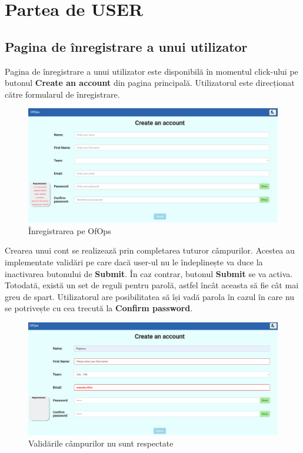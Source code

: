 \section{Partea de USER}

\subsection{Pagina de înregistrare a unui utilizator}

Pagina de înregistrare a unui utilizator este disponibilă în momentul click-ului pe butonul \textbf{Create an account} din pagina principală. Utilizatorul este direcționat către formularul de înregistrare.  

\newpage

\begin{figure}[!htb]
    \centering
    \includegraphics[width=0.9\linewidth]{images/inregistrare.png}
    \caption{Înregistrarea pe OfOps}
    \label{fig:inregistrare}
\end{figure}

Crearea unui cont se realizează prin completarea tuturor câmpurilor. Acestea au implementate validări pe care dacă user-ul nu le îndeplinește va duce la inactivarea butonului de \textbf{Submit}. În caz contrar, butonul \textbf{Submit} se va activa. Totodată, există un set de reguli pentru parolă, astfel încât aceasta să fie cât mai greu de spart. Utilizatorul are posibilitatea să își vadă parola în cazul în care nu se potrivește cu cea trecută la \textbf{Confirm password}.

\begin{figure}[!htb]
    \centering
    \includegraphics[width=0.9\linewidth]{images/greseli.png}
    \caption{Validările câmpurilor nu sunt respectate}
    \label{fig:greseli}
\end{figure}

